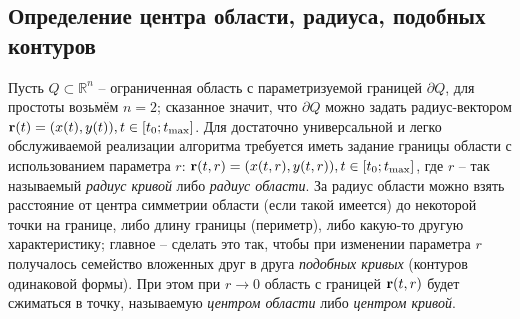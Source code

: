 \documentclass[a4paper, 12pt]{article}
\newcommand{\R}[1]{\mathbb{R}^#1}
\begin{document}
\subsection{Определение центра области, радиуса, подобных контуров}
Пусть $Q \subset \R{n} $ -- ограниченная область с параметризуемой границей $\partial Q$, для простоты возьмём $n=2$;
сказанное значит, что $\partial Q$ можно задать радиус-вектором ${\bf r}(t)=(x(t),y(t)), t \in [t_0;t_{\max}]$.
Для достаточно универсальной и легко обслуживаемой реализации алгоритма требуется иметь задание границы области с использованием параметра $r$: ${\bf r}(t,r)=(x(t,r),y(t,r)), t \in [t_0;t_{\max}]$, где $r$ -- так называемый {\it радиус кривой} либо {\it радиус области}.
За радиус области можно взять расстояние от центра симметрии области (если такой имеется) до некоторой точки на границе, либо длину границы (периметр), либо какую-то другую характеристику;
главное -- сделать это так, чтобы при изменении параметра $r$ получалось семейство вложенных друг в друга {\it подобных кривых} (контуров одинаковой формы). При этом при $r \rightarrow 0$ область с границей ${\bf r}(t,r)$ будет сжиматься в точку, называемую {\it центром области} либо {\it центром кривой}.
\end{document}
